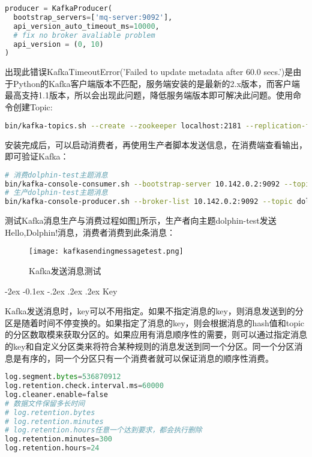 \documentclass[8pt]{book}
\makeatletter
\numberwithin{dummy}{section}
\theoremstyle{ocrenumbox}
\theoremstyle{blacknumex}
\theoremstyle{blacknumbox}
\theoremstyle{ocrenum}
\renewcommand{\subsubsection}{\@startsection {subsubsection}{3}{\z@}
	{-2ex \@plus -0.1ex \@minus -.2ex}
	{.2ex \@plus.2ex }
	{\normalfont\small\sffamily\bfseries}}
\makeatother
\begin{document}
\begin{lstlisting}[language=Python]
producer = KafkaProducer(
  bootstrap_servers=['mq-server:9092'],
  api_version_auto_timeout_ms=10000,
  # fix no broker avaliable problem
  api_version = (0, 10)
)
\end{lstlisting}

出现此错误KafkaTimeoutError('Failed to update metadata after 60.0 secs.')是由于Python的Kafka客户端版本不匹配，服务端安装的是最新的2.x版本，而客户端最高支持1.1版本，所以会出现此问题，降低服务端版本即可解决此问题。使用命令创建Topic:

\begin{lstlisting}[language=Bash]
bin/kafka-topics.sh --create --zookeeper localhost:2181 --replication-factor 1 --partitions 1 --topic dolphin-test
\end{lstlisting}

安装完成后，可以启动消费者，再使用生产者脚本发送信息，在消费端查看输出，即可验证Kafka：

\begin{lstlisting}[language=Bash]
# 消费dolphin-test主题消息
bin/kafka-console-consumer.sh --bootstrap-server 10.142.0.2:9092 --topic dolphin-spider-google-book-bookinfo --from-beginning
# 生产dolphin-test主题消息
bin/kafka-console-producer.sh --broker-list 10.142.0.2:9092 --topic dolphin-test
\end{lstlisting}

测试Kafka消息生产与消费过程如图\ref{fig:kafkasendingmessagetest}所示，生产者向主题dolphin-test发送Hello,Dolphin!消息，消费者消费到此条消息：

\begin{figure}[htbp]
	\centering
	\texttt{[image: kafkasendingmessagetest.png]}
	\caption{Kafka发送消息测试}
	\label{fig:kafkasendingmessagetest}
\end{figure}

\subsubsection{Key}

Kafka发送消息时，key可以不用指定。如果不指定消息的key，则消息发送到的分区是随着时间不停变换的。如果指定了消息的key，则会根据消息的hash值和topic的分区数取模来获取分区的。如果应用有消息顺序性的需要，则可以通过指定消息的key和自定义分区类来将符合某种规则的消息发送到同一个分区。同一个分区消息是有序的，同一个分区只有一个消费者就可以保证消息的顺序性消费。

\begin{lstlisting}[language=Python]
log.segment.bytes=536870912
log.retention.check.interval.ms=60000
log.cleaner.enable=false
# 数据文件保留多长时间
# log.retention.bytes
# log.retention.minutes
# log.retention.hours任意一个达到要求，都会执行删除
log.retention.minutes=300
log.retention.hours=24
\end{lstlisting}
\end{document}
